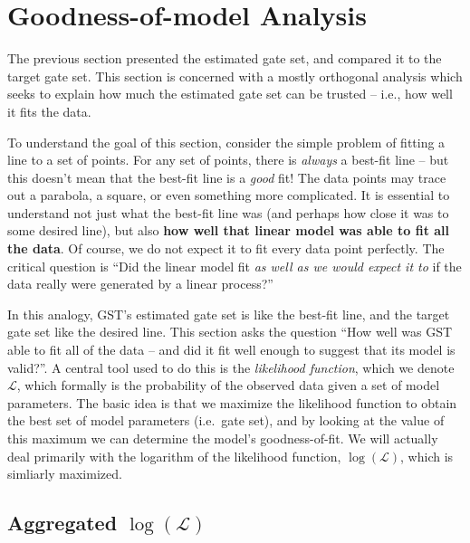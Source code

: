\documentclass{article}[11pt]
\begin{document}
\section{Goodness-of-model Analysis\label{secGoodness}}

The previous section presented the estimated gate set, and compared it to the target gate set.  This section is concerned with a mostly orthogonal analysis which seeks to explain how much the estimated gate set can be trusted -- i.e., how well it fits the data.

To understand the goal of this section, consider the simple problem of fitting a line to a set of points.  For any set of points, there is \emph{always} a best-fit line -- but this doesn't mean that the best-fit line is a \emph{good} fit!  The data points may trace out a parabola, a square, or even something more complicated.  It is essential to understand not just what the best-fit line was (and perhaps how close it was to some desired line), but also \textbf{how well that linear model was able to fit all the data}.  Of course, we do not expect it to fit every data point perfectly.  The critical question is ``Did the linear model fit \emph{as well as we would expect it to} if the data really were generated by a linear process?''

In this analogy, GST's estimated gate set is like the best-fit line, and the target gate set like the desired line.  This section asks the question ``How well was GST able to fit all of the data -- and did it fit well enough to suggest that its model is valid?''. A central tool used to do this is the \emph{likelihood function}, which we denote $\mathcal{L}$, which formally is the probability of the observed data given a set of model parameters.  The basic idea is that we maximize the likelihood function to obtain the best set of model parameters (i.e.~gate set), and by looking at the value of this maximum we can determine the model's goodness-of-fit.  We will actually deal primarily with the logarithm of the likelihood function, $\log(\mathcal{L})$, which is simliarly maximized.

\subsection{Aggregated $\log(\mathcal{L})$}
\end{document}
